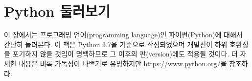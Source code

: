 \section{Python 둘러보기}

이 장에서는 프로그래밍 언어(programming language)인 파이썬(Python)에 대해서 간단히 둘러본다. 이 책은 Python 3.7을 기준으로 작성되었으며 개발진이 하위 호완성을 포기하지 않을 것임이 명백하므로 그 이후의 판(version)에도 적용될 것이다. 더 자세한 내용은 비록 가독성이 나쁘기로 유명하지만 \url{https://www.python.org/}을 참조하라.
